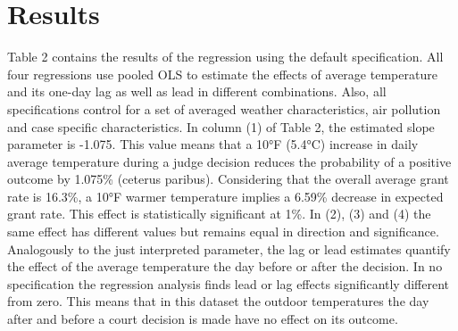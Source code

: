 \documentclass[11pt]{article}
\begin{document}
	\section{Results}
	Table 2 contains the results of the regression using the default specification. All four regressions use pooled OLS to estimate the effects of average temperature and its one-day lag as well as lead in different combinations. Also, all specifications control for a set of averaged weather characteristics, air pollution and case specific characteristics.
	In column (1) of Table 2, the estimated slope parameter is -1.075. This value means that a 10°F (5.4°C) increase in daily average temperature during a judge decision reduces the probability of a positive outcome by 1.075\% (ceterus paribus). Considering that the overall average grant rate is 16.3\%, a 10°F warmer temperature implies a 6.59\% decrease in expected grant rate. This effect is statistically significant at 1\%. In (2), (3) and (4) the same effect has different values but remains equal in direction and significance. Analogously to the just interpreted parameter, the lag or lead estimates quantify the effect of the average temperature the day before or after the decision. In no specification the regression analysis finds lead or lag effects significantly different from zero. This means that in this dataset the outdoor temperatures the day after and before a court decision is made have no effect on its outcome. 	
	
\end{document}
